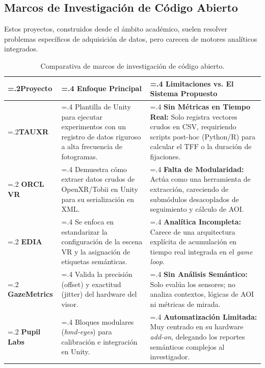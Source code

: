 \documentclass[12pt,a4paper]{article}
\begin{document}
\subsection{Marcos de Investigación de Código Abierto}
Estos proyectos, construidos desde el ámbito académico, suelen resolver problemas específicos de adquisición de datos, pero carecen de motores analíticos integrados.

\begin{table}[H]
    \centering
    \small
    \begin{tabularx}{\textwidth}{@{} >{\hsize=.2\hsize}X >{\hsize=.4\hsize}X >{\hsize=.4\hsize}X @{}}
        \toprule
        \textbf{Proyecto}                       & \textbf{Enfoque Principal}                                                                                       & \textbf{Limitaciones vs. El Sistema Propuesto}                                                                                                                        \\
        \midrule
        \textbf{TAUXR} \cite{tauxr}             & Plantilla de Unity para ejecutar experimentos con un registro de datos riguroso a alta frecuencia de fotogramas. & \textbf{Sin Métricas en Tiempo Real:} Solo registra vectores crudos en CSV, requiriendo scripts post-hoc (Python/R) para calcular el TFF o la duración de fijaciones. \\
        \addlinespace
        \textbf{ORCL VR} \cite{orcl}            & Demuestra cómo extraer datos crudos de OpenXR/Tobii en Unity para su serialización en XML.                       & \textbf{Falta de Modularidad:} Actúa como una herramienta de extracción, careciendo de submódulos desacoplados de seguimiento y cálculo de AOI.                       \\
        \addlinespace
        \textbf{EDIA} \cite{edia}               & Se enfoca en estandarizar la configuración de la escena VR y la asignación de etiquetas semánticas.              & \textbf{Analítica Incompleta:} Carece de una arquitectura explícita de acumulación en tiempo real integrada en el \textit{game loop}.                                 \\
        \addlinespace
        \textbf{GazeMetrics} \cite{gazemetrics} & Valida la precisión (offset) y exactitud (jitter) del hardware del visor.                                        & \textbf{Sin Análisis Semántico:} Solo evalúa los sensores; no analiza contextos, lógicas de AOI ni métricas de mirada.                                                \\
        \addlinespace
        \textbf{Pupil Labs} \cite{pupillabs}    & Bloques modulares (\textit{hmd-eyes}) para calibración e integración en Unity.                                   & \textbf{Automatización Limitada:} Muy centrado en su hardware \textit{add-on}, delegando los reportes semánticos complejos al investigador.                           \\
        \bottomrule
    \end{tabularx}
    \caption{Comparativa de marcos de investigación de código abierto.}
\end{table}
\end{document}
